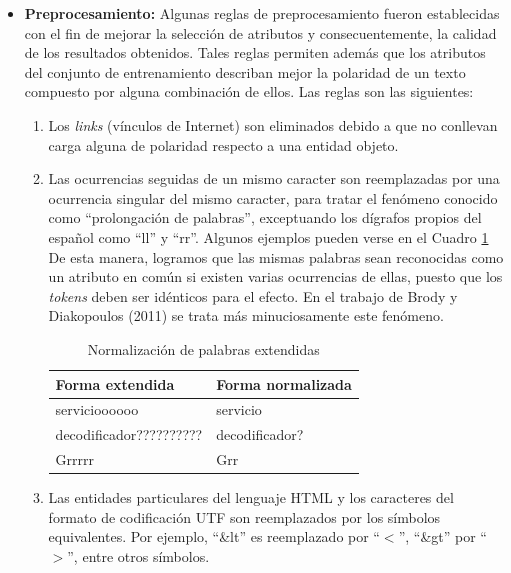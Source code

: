 \begin{itemize}
\item \textbf{Preprocesamiento:} Algunas reglas de preprocesamiento fueron establecidas con el fin de mejorar la selecci\'on de atributos y consecuentemente, la calidad de los resultados obtenidos. Tales reglas permiten adem\'as que los atributos del conjunto de entrenamiento describan mejor la polaridad de un texto compuesto por alguna combinaci\'on de ellos. Las reglas son las siguientes:
\begin{enumerate}
\item Los \textit{links} (v\'inculos de Internet) son eliminados debido a que no conllevan carga alguna de polaridad respecto a una entidad objeto.
\item Las ocurrencias seguidas de un mismo caracter son reemplazadas por una ocurrencia singular del mismo caracter, para tratar el fen\'omeno conocido como ``prolongaci\'on de palabras'', exceptuando los d\'igrafos propios del espa\~nol como ``ll'' y ``rr''. Algunos ejemplos pueden verse en el Cuadro \ref{lengthening} De esta manera, logramos que las mismas palabras sean reconocidas como un atributo en com\'un si existen varias ocurrencias de ellas, puesto que los \textit{tokens} deben ser id\'enticos para el efecto. En el trabajo de Brody y Diakopoulos (2011) se trata m\'as minuciosamente este fen\'omeno.
\newline

\begin{table}[htb] 
\centering
\begin{tabular}{|p{5cm}|p{5cm}|}
\hline
\textbf{Forma extendida}	&	\textbf{Forma normalizada}	\\
\hline
servicioooooo				&	servicio	\\
\hline
decodificador??????????		&	decodificador?	\\
\hline
Grrrrr						&	Grr	\\
\hline
\end{tabular}
\caption{Normalizaci\'on de palabras extendidas}
\label{lengthening}
\end{table}

\item Las entidades particulares del lenguaje HTML y los caracteres del formato de codificaci\'on UTF son reemplazados por los s\'imbolos equivalentes. Por ejemplo, ``\&lt'' es reemplazado por ``$<$'', ``\&gt'' por ``$>$'', entre otros s\'imbolos.




\end{enumerate}
\end{itemize}
